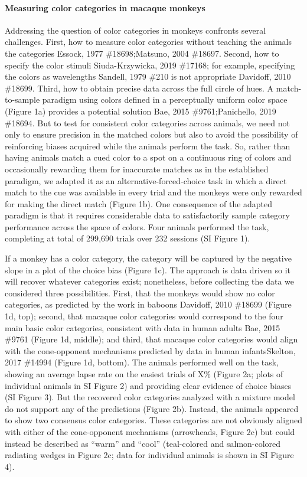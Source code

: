\paragraph{Measuring color categories in macaque monkeys}
Addressing the question of color categories in monkeys confronts several challenges. First, how to measure color categories without teaching the animals the categories {Essock, 1977 \#18698;Matsuno, 2004 \#18697}. Second, how to specify the color stimuli {Siuda-Krzywicka, 2019 \#17168}; for example, specifying the colors as wavelengths {Sandell, 1979 \#210} is not appropriate {Davidoff, 2010 \#18699}. Third, how to obtain precise data across the full circle of hues. A match-to-sample paradigm using colors defined in a perceptually uniform color space (Figure 1a) provides a potential solution {Bae, 2015 \#9761;Panichello, 2019 \#18694}.  But to test for consistent color categories across animals, we need not only to ensure precision in the matched colors but also to avoid the possibility of reinforcing biases acquired while the animals perform the task. So, rather than having animals match a cued color to a spot on a continuous ring of colors and occasionally rewarding them for inaccurate matches as in the established paradigm, we adapted it as an alternative-forced-choice task in which a direct match to the cue was available in every trial and the monkeys were only rewarded for making the direct match (Figure 1b). One consequence of the adapted paradigm is that it requires considerable data to satisfactorily sample category performance across the space of colors. Four animals performed the task, completing at total of 299,690 trials over 232 sessions (SI Figure 1). 

If a monkey has a color category, the category will be captured by the negative slope in a plot of the choice bias (Figure 1c). The approach is data driven so it will recover whatever categories exist; nonetheless, before collecting the data we considered three possibilities. First, that the monkeys would show no color categories, as predicted by the work in baboons {Davidoff, 2010 \#18699} (Figure 1d, top); second, that macaque color categories would correspond to the four main basic color categories, consistent with data in human adults {Bae, 2015 \#9761} (Figure 1d, middle); and third, that macaque color categories would align with the cone-opponent mechanisms predicted by data in human infants{Skelton, 2017 \#14994} (Figure 1d, bottom). The animals performed well on the task, showing an average lapse rate on the easiest trials of X\% (Figure 2a; plots of individual animals in SI Figure 2) and providing clear evidence of choice biases (SI Figure 3). But the recovered color categories analyzed with a mixture model do not support any of the predictions (Figure 2b). Instead, the animals appeared to show two consensus color categories. These categories are not obviously aligned with either of the cone-opponent mechanisms (arrowheads, Figure 2c) but could instead be described as “warm” and “cool” (teal-colored and salmon-colored radiating wedges in Figure 2c; data for individual animals is shown in SI Figure 4).

